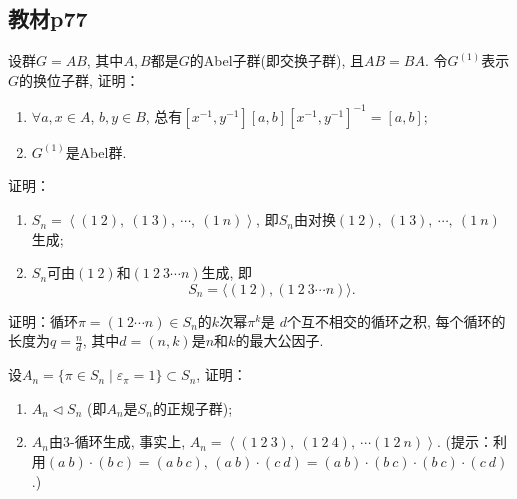 \subsection{教材p77}

\begin{problem}
    设群$G = AB$, 其中$A, B$都是$G$的Abel子群(即交换子群),
且$AB = BA$. 令$G^{(1)}$表示$G$的换位子群, 证明：
\begin{enumerate}[(1)]
    \item $\forall a, x \in A$, $b, y \in B$,
总有$[x^{-1}, y^{-1}][a, b][x^{-1}, y^{-1}]^{-1} = [a, b]$;
    \item $G^{(1)}$是Abel群.
\end{enumerate}
\end{problem}

\begin{solution}
    
\end{solution}

\begin{problem}
    证明：
\begin{enumerate}[(1)]
    \item $S_{n} = \left\langle (1\:2),\: (1\:3),\: \cdots,\: (1\:n) \right\rangle$,
即$S_n$由对换$(1\:2),\: (1\:3),\: \cdots,\: (1\:n)$生成;
    \item $S_{n}$可由$(1\:2)$和$(1\:2\:3 \cdots n)$生成, 即
\[
    S_n = \big\langle (1\:2),(1\:2\:3 \cdots n) \big\rangle.
\]
\end{enumerate}
\end{problem}

\begin{solution}
    
\end{solution}

\begin{problem}
    证明：循环$\pi = (1\:2 \cdots n) \in S_n$的$k$次幂$\pi^k$是
$d$个互不相交的循环之积, 每个循环的长度为$q = \frac nd$,
其中$d = (n, k)$是$n$和$k$的最大公因子.
\end{problem}

\begin{solution}
    
\end{solution}

\begin{problem}
    设$A_n= \{\pi \in S_n \mid \varepsilon_\pi = 1\} \subset S_n$,
证明：
\begin{enumerate}[(1)]
    \item $A_n \lhd S_n$ (即$A_n$是$S_n$的正规子群);
    \item $A_n$由$3$-循环生成, 事实上, $A_n = \left\langle (1\:2\:3),\: (1\:2\:4),\: \cdots (1\:2\:n) \right\rangle$.
(提示：利用$(a\:b) \cdot (b\:c) = (a\:b\:c),\, (a\:b) \cdot (c\:d) = (a\:b) \cdot (b\:c) \cdot (b\:c) \cdot (c\:d)$.)
\end{enumerate}
\end{problem}

